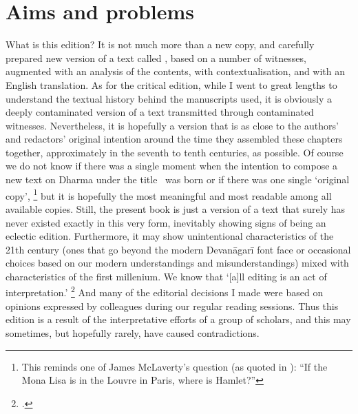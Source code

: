 \documentclass[11pt]{book}
\begin{document}

\vfill
\pagebreak




\section{Aims and problems}
\frenchspacing

\noindent
What is this edition? It is not much more than
 a new copy, and carefully prepared new version
of a text called \Vss, based on a number of witnesses,
augmented with an analysis of the contents, with
contextualisation, and with an English translation.
As for the critical edition, while I went to great 
lengths to understand the textual history behind 
the manuscripts used, it is obviously a deeply contaminated 
version of a text transmitted through contaminated witnesses.
Nevertheless, it is hopefully a version that is as 
close to the authors' and redactors' original intention
around the time they assembled these chapters together, 
approximately in the seventh to tenth centuries, as possible. 
Of course we do not know if there was a single moment
when the intention to compose a new text on Dharma
under the title \Vss\ was born or if there was one single
`original copy',%
		\footnote{This reminds one of James McLaverty's
                  question (as quoted in
   				  ):
                 ``If the Mona Lisa is in the Louvre in Paris, where is Hamlet?''}
but it is hopefully the most meaningful and most readable
among all available copies. Still, the present book is just a
version of a text that surely has never existed exactly 
in this very form, inevitably showing
signs of being an eclectic edition. 
Furthermore, it may show unintentional 
characteristics of the 21th century 
(ones that go beyond the modern Devanāgarī font face
or occasional choices based on our modern understandings and
misunderstandings) 
mixed with characteristics of the first millenium. 
We know that `[a]ll editing is an act of interpretation.'%
		\footnote{.}
And many of the editorial decisions I made were based
on opinions expressed by colleagues during our
regular reading sessions. Thus this edition is a result
of the interpretative efforts of a group of scholars, and
this may sometimes, but hopefully rarely, have caused contradictions.
\end{document}
